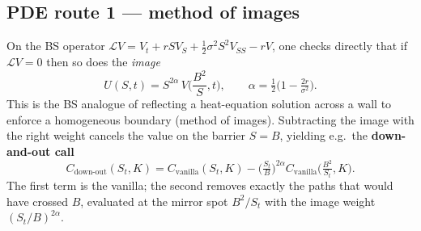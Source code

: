 \documentclass[11pt]{article}
\begin{document}
\subsection{PDE route 1 --- method of images}\label{sec:images}
On the BS operator $\mathcal L V=V_t+rSV_S+\tfrac12\sigma^2S^2V_{SS}-rV$, one checks directly that if
$\mathcal L V=0$ then so does the \emph{image}
\begin{equation}\label{eq:image}
U(S,t)=S^{2\alpha}\,V\!\Big(\frac{B^2}{S},t\Big),\qquad \alpha=\tfrac12\Big(1-\tfrac{2r}{\sigma^2}\Big).
\end{equation}
This is the BS analogue of reflecting a heat-equation solution across a wall to enforce a homogeneous
boundary (method of images). Subtracting the image with the right weight cancels the value on the barrier
$S=B$, yielding e.g.\ the \textbf{down-and-out call}
\begin{equation}\label{eq:dao}
C_{\text{down-out}}(S_t,K)=C_{\text{vanilla}}(S_t,K)-\Big(\tfrac{S_t}{B}\Big)^{2\alpha}
C_{\text{vanilla}}\!\Big(\tfrac{B^2}{S_t},K\Big).
\end{equation}
The first term is the vanilla; the second removes exactly the paths that would have crossed $B$, evaluated at
the mirror spot $B^2/S_t$ with the image weight $(S_t/B)^{2\alpha}$.
\end{document}
